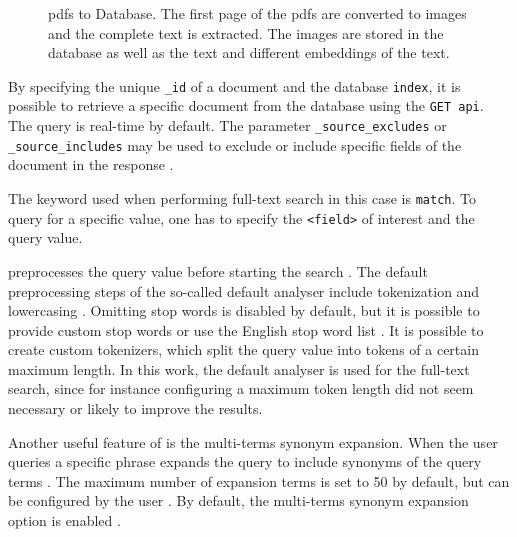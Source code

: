 \begin{figure}[htp] %
    \centering
    
    \caption{\acp{pdf} to Database. 
    The first page of the \acp{pdf} are converted to images and the complete text is extracted. 
    The images are stored in the database as well as the text and different embeddings of the text.
    }
    \label{fig:pdf2db}
\end{figure}

By specifying the unique \texttt{\_id} of a document and the database \texttt{index}, it is possible to retrieve a specific document from the database using the \texttt{GET \ac{api}}.
The query is real-time by default.
The parameter \texttt{\_source\_excludes} or \texttt{\_source\_includes} may be used to exclude or include specific fields of the document in the response \cite{Elasticsearch-get}.

The keyword used when performing full-text search in this case is \texttt{match}.
To query for a specific value, one has to specify the \texttt{<field>} of interest and the query value.

\databaseName{} preprocesses the query value before starting the search \cite{Elasticsearch-text-analyser}.
The default preprocessing steps of the so-called default analyser include tokenization and lowercasing \cite{Elasticsearch-standard-analyser}. 
Omitting stop words is disabled by default, but it is possible to provide custom stop words or use the English stop word list \cite{Elasticsearch-standard-analyser}.
It is possible to create custom tokenizers, which split the query value into tokens of a certain maximum length.
In this work, the default analyser is used for the full-text search, since for instance configuring a maximum token length did not seem necessary or likely to improve the results.

Another useful feature of \databaseName{} is the multi-terms synonym expansion.
When the user queries a specific phrase \databaseName{} expands the query to include synonyms of the query terms \cite{Elasticsearch-synonyms}.
The maximum number of expansion terms is set to 50 by default, but can be configured by the user \cite{Elasticsearch-match}.
By default, the multi-terms synonym expansion option is enabled \cite{Elasticsearch-match}.

